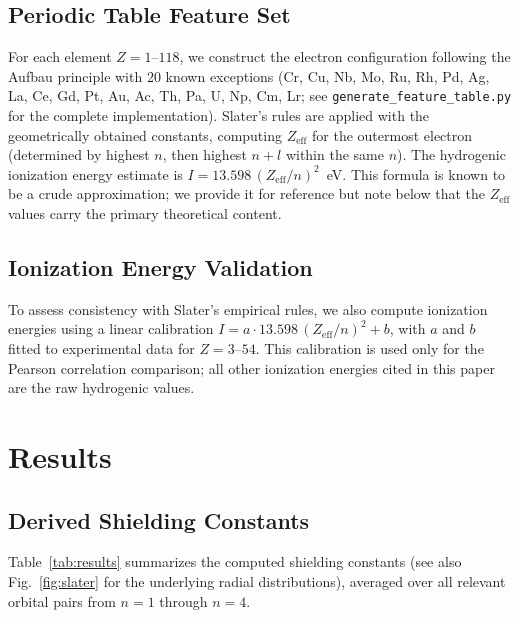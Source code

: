 \documentclass[11pt,a4paper]{article}
\begin{document}
\subsection{Periodic Table Feature Set}

For each element $Z = 1$--$118$, we construct the electron configuration following the Aufbau principle with 20 known exceptions (Cr, Cu, Nb, Mo, Ru, Rh, Pd, Ag, La, Ce, Gd, Pt, Au, Ac, Th, Pa, U, Np, Cm, Lr; see \texttt{generate\_feature\_table.py} for the complete implementation). Slater's rules are applied with the geometrically obtained constants, computing $Z_{\mathrm{eff}}$ for the outermost electron (determined by highest $n$, then highest $n+l$ within the same $n$). The hydrogenic ionization energy estimate is $I = 13.598\,(Z_{\mathrm{eff}}/n)^2$~eV. This formula is known to be a crude approximation; we provide it for reference but note below that the $Z_{\mathrm{eff}}$ values carry the primary theoretical content.

\subsection{Ionization Energy Validation}

To assess consistency with Slater's empirical rules, we also compute ionization energies using a linear calibration $I = a \cdot 13.598\,(Z_{\mathrm{eff}}/n)^2 + b$, with $a$ and $b$ fitted to experimental data for $Z=3$--$54$. This calibration is used only for the Pearson correlation comparison; all other ionization energies cited in this paper are the raw hydrogenic values.

\section{Results}\label{sec:results}

\subsection{Derived Shielding Constants}

Table~\ref{tab:results} summarizes the computed shielding constants (see also Fig.~\ref{fig:slater} for the underlying radial distributions), averaged over all relevant orbital pairs from $n=1$ through $n=4$.
\end{document}
